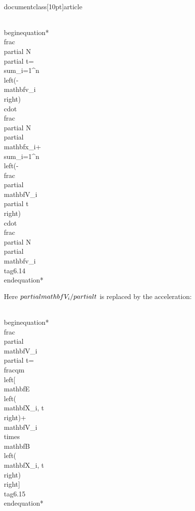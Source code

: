 \\documentclass[10pt]{article}
\begin{document}
{{{{\\begin{equation*}
\\frac{\\partial N}{\\partial t}=\\sum_{i=1}^{n}\\left(-\\mathbf{v}_{i}\\right) \\cdot \\frac{\\partial N}{\\partial \\mathbf{x}_{i}}+\\sum_{i=1}^{n}\\left(-\\frac{\\partial \\mathbf{V}_{i}}{\\partial t}\\right) \\cdot \\frac{\\partial N}{\\partial \\mathbf{v}_{i}} \\tag{6.14}
\\end{equation*}


Here $\\partial \\mathbf{V}_{i} / \\partial t$ is replaced by the acceleration:


\\begin{equation*}
\\frac{\\partial \\mathbf{V}_{i}}{\\partial t}=\\frac{q}{m}\\left[\\mathbf{E}\\left(\\mathbf{X}_{i}, t\\right)+\\mathbf{V}_{i} \\times \\mathbf{B}\\left(\\mathbf{X}_{i}, t\\right)\\right] \\tag{6.15}
\\end{equation*}


}}}}
\end{document}
